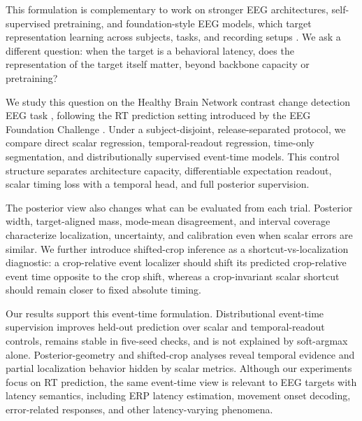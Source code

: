 \documentclass[12pt]{article}
\begin{document}
This formulation is complementary to work on stronger EEG architectures, self-supervised pretraining, and foundation-style EEG models, which target representation learning across subjects, tasks, and recording setups \citep{wang2024eegpt,Jiang2024LaBraM,Chen2024EEGFormer,Wang2025EEGMamba,ElOuahidi2025REVE,Yue2024BrainGPT}. We ask a different question: when the target is a behavioral latency, does the representation of the target itself matter, beyond backbone capacity or pretraining?

We study this question on the Healthy Brain Network contrast change detection EEG task \citep{Shirazi2024HBNEEG}, following the RT prediction setting introduced by the EEG Foundation Challenge \citep{EEGFoundationChallengeArxiv2025,EEGChallengeWebsite2025}. Under a subject-disjoint, release-separated protocol, we compare direct scalar regression, temporal-readout regression, time-only segmentation, and distributionally supervised event-time models. This control structure separates architecture capacity, differentiable expectation readout, scalar timing loss with a temporal head, and full posterior supervision.

The posterior view also changes what can be evaluated from each trial. Posterior width, target-aligned mass, mode-mean disagreement, and interval coverage characterize localization, uncertainty, and calibration even when scalar errors are similar. We further introduce shifted-crop inference as a shortcut-vs-localization diagnostic: a crop-relative event localizer should shift its predicted crop-relative event time opposite to the crop shift, whereas a crop-invariant scalar shortcut should remain closer to fixed absolute timing.

Our results support this event-time formulation. Distributional event-time supervision improves held-out prediction over scalar and temporal-readout controls, remains stable in five-seed checks, and is not explained by soft-argmax alone. Posterior-geometry and shifted-crop analyses reveal temporal evidence and partial localization behavior hidden by scalar metrics. Although our experiments focus on RT prediction, the same event-time view is relevant to EEG targets with latency semantics, including ERP latency estimation, movement onset decoding, error-related responses, and other latency-varying phenomena.
\end{document}
